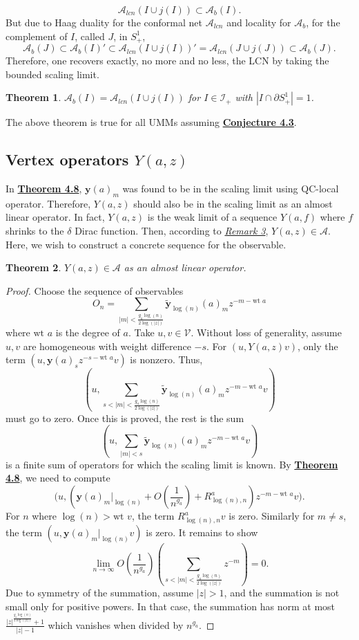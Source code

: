 \documentclass[twoside,11pt,titlepage]{amsart}
\renewcommand{\=}[1]{\stackrel{#1}{=}} %
\newtheorem{thm}{Theorem}[section]
\theoremstyle{definition}
\theoremstyle{remark}
\begin{document}
$$\mathcal{A}_{lcn}(I \cup j(I)) \subset \mathcal{A}_b(I).$$
But due to Haag duality for the conformal net $\mathcal{A}_{lcn}$ and locality for $\mathcal{A}_b$, for the complement of $I$, called $J$, in $S^1_+$,
$$\mathcal{A}_b(J) \subset \mathcal{A}_b(I)' \subset \mathcal{A}_{lcn}(I \cup j(I))'=\mathcal{A}_{lcn}(J \cup j(J)) \subset \mathcal{A}_b(J) .$$
Therefore, one recovers exactly, no more and no less, the LCN by taking the bounded scaling limit.
\begin{thm}\label{thm4.13}
$\mathcal{A}_b(I)=\mathcal{A}_{lcn}(I \cup j(I))$ for $I \in \mathcal{I}_+$ with $|I \cap \partial S^1_+|=1$.
\end{thm}
The above theorem is true for all UMMs assuming \hyperref[cnj4.3]{\textbf{Conjecture 4.3}}.

\subsection{Vertex operators \texorpdfstring{$Y(a,z)$}{TEXT}}\label{4.3}

\hfill \break 
In \hyperref[thm4.8]{\textbf{Theorem 4.8}}, ${\textbf{y}}(a)_m$ was found to be in the scaling limit using QC-local operator. Therefore, $Y(a,z)$ should also be in the scaling limit as an almost linear operator. In fact, $Y(a,z)$ is the weak limit of a sequence $Y(a,f)$ where $f$ shrinks to the $\delta$ Dirac function. Then, according to \hyperref[rmk3]{\textit{Remark 3}}, $Y(a,z) \in \mathcal{A}$. Here, we wish to construct a concrete sequence for the observable.
\begin{thm} \label{thm4.14}
$Y(a,z) \in \mathcal{A}$ as an almost linear operator.
\end{thm}
\begin{proof}
Choose the sequence of observables
$$O_n=\sum_{|m| < \frac{g_a\log(n)}{2\log(|z|)}} \widetilde{\textbf{y}}_{\log(n)}(a)_m z^{-m-\text{wt }a}$$
where $\text{wt }a$ is the degree of $a$. Take $u,v \in \mathcal{V}$. Without loss of generality, assume $u,v$ are homogeneous with weight difference $-s$. For $(u,Y(a,z)v)$, only the term $(u,{\textbf{y}}(a)_sz^{-s-\text{wt }a}v)$ is nonzero. Thus, 
$$(u,\sum_{s< |m| < \frac{g_a\log(n)}{2\log(|z|)}} \widetilde{\textbf{y}}_{\log(n)}(a)_m z^{-m-\text{wt }a}v)$$
must go to zero. Once this is proved, the rest is the sum 
$$(u,\sum_{ |m| <s} \widetilde{\textbf{y}}_{\log(n)}(a)_m z^{-m-\text{wt }a}v)$$
is a finite sum of operators for which the scaling limit is known. By \hyperref[thm4.8]{\textbf{Theorem 4.8}}, we need to compute
$$\Big(u, ({\textbf{y}}(a)_m|_{\log(n)}+O(\frac{1}{n^{g_a}})+R_{\log(n),n}^a)z^{-m-\text{wt }a}v\Big).$$
For $n$ where $\log(n)>\text{wt }v$, the term $R_{\log(n),n}^av$ is zero. Similarly for $m \neq s$, the term $(u,{\textbf{y}}(a)_m|_{\log(n)}v)$ is zero. It remains to show
$$ \lim\limits_{n \to \infty} O(\frac{1}{n^{g_a}})(\sum_{s<|m|<\frac{g_a\log(n)}{2\log(|z|)}}z^{-m}) = 0.$$
Due to symmetry of the summation, assume $|z|> 1$, and the summation is not small only for positive powers. In that case, the summation has norm at most $\frac{|z|^{\frac{g_a\log(n)}{2\log(|z|)}}+1}{|z|-1}$ which vanishes when divided by $n^{g_a}$.
\end{proof}
\end{document}
